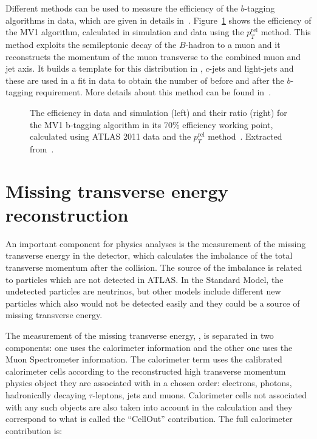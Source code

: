 Different methods can be used to measure the efficiency of the $b$-tagging algorithms in data, which are given in details in~\cite{btag2011,mv1note}. Figure~\ref{fig:btag_ptrel} shows the efficiency of the MV1 algorithm, calculated in simulation and data using the $p_T^{\textrm{rel}}$ method. This method
exploits the semileptonic decay of the $B$-hadron to a muon and it reconstructs the momentum of the muon transverse to the combined muon and jet axis. It builds a template
for this distribution in \bjets, $c$-jets and light-jets and these are used in a fit in data to obtain the number of \bjets before and after the $b$-tagging requirement. More
details about this method can be found in~\cite{btag2011,mv1note}.

\begin{figure}
\centering
{}
\hspace{0.05cm}
\caption{The efficiency in data and simulation (left) and their ratio (right) for the MV1 b-tagging algorithm in its 70\% efficiency working point, calculated using ATLAS 2011 data and the $p_T^{\textrm{rel}}$ method~\cite{btag2011,mv1note}. Extracted from~\cite{mv1note}.}
\label{fig:btag_ptrel}
\end{figure}

\section{Missing transverse energy reconstruction}
\label{sec:atlas_met}

An important component for physics analyses is the measurement of the missing transverse energy in the detector, which calculates the imbalance of the total transverse
momentum after the collision. The source of the imbalance is related to particles which are not detected in ATLAS. In the Standard Model, the undetected particles are
neutrinos, but other models include different new particles which also would not be detected easily and they could be a source of missing transverse energy.

The measurement of the missing transverse energy, \met, is separated in two components: one uses the calorimeter information and the other one uses the
Muon Spectrometer information. The calorimeter term uses the calibrated calorimeter cells according to the reconstructed high transverse momentum physics object
they are associated with in a chosen order: electrons, photons, hadronically decaying $\tau$-leptons, jets and muons. Calorimeter cells not associated with any such objects
are also taken into account in the \met calculation and they correspond to what is called the ``CellOut'' \met contribution. The full calorimeter \met contribution is:

